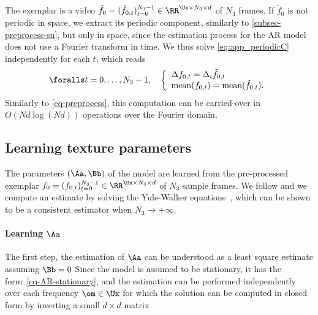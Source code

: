 The exemplar is a video $\tilde f_0 = (\tilde f_{0,t})_{t=0}^{N_3-1} \in \RR^{\Ux \times N_3 \times d}$ of $N_3$ frames. If $\tilde f_0$ is not periodic in space, we extract its periodic component, similarly to \eqref{subsec-preprocess-sn}, but only in space, since the estimation process for the AR model does not use a Fourier transform in time. We thus solve \eqref{eq:app_periodicC} independently for each $t$, which reads
\begin{align}
	\foralls t=0,\ldots,N_3-1, \quad
	\left\{
	\begin{array}{ll}
 		\Delta f_{0,t} = \Delta_i \tilde f_{0,t} \\
		 \textrm{mean}(f_{0,t}) = \textrm{mean}(\tilde f_{0,t}).
	\end{array}
	\right.
	\label{eq-preprocess-ar}
\end{align}
Similarly to \eqref{eq-preprocess}, this computation can be carried over in $O(Nd \log(Nd))$ operations over the Fourier domain.



\subsection{Learning texture parameters}


The parameters $(\Aa,\Bb)$ of the model are learned from the pre-processed exemplar $f_0 = (f_{0,t})_{t=0}^{N_3-1} \in \RR^{\Ux \times N_3 \times d}$ of $N_3$ sample frames. We follow \cite{dorettoCWS03ijcv} and we compute an estimate by solving the Yule-Walker equations~\cite{PanditWu}, which can be shown to be a consistent estimator when $N_3 \rightarrow +\infty$.


\paragraph*{Learning $\Aa$}

The first step, the estimation of $\Aa$ can be understood as a least square estimate assuming $\Bb=0$
Since the model is assumed to be stationary, it has the form~\eqref{eq-AR-stationary}, and the estimation can be performed independently over each frequency $\om \in \Ux$
for which the solution can be computed in closed form by inverting a small $d \times d$ matrix


